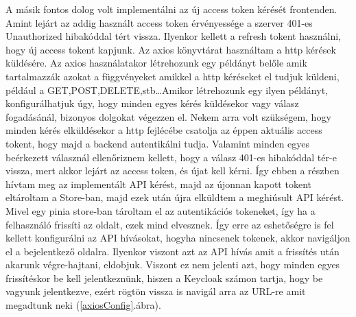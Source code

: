 \documentclass[a4paper,twoside]{article}
\begin{document}
A másik fontos dolog volt implementálni az új access token kérését frontenden. Amint lejárt az addig használt access token érvényessége a szerver 401-es Unauthorized 
hibakóddal tért vissza. Ilyenkor kellett a refresh tokent használni, hogy új access tokent kapjunk. Az axios könyvtárat használtam a http kérések küldésére. Az axios 
használatakor létrehozunk egy példányt belőle amik tartalmazzák azokat a függvényeket amikkel a http kéréseket el tudjuk küldeni, például a GET,POST,DELETE,stb\ldots Amikor létrehozunk egy ilyen példányt, konfigurálhatjuk úgy, hogy minden egyes kérés küldésekor vagy válasz fogadásánál, bizonyos dolgokat végezzen el. Nekem arra volt szükségem, hogy minden kérés elküldésekor a http fejlécébe csatolja az éppen aktuális access tokent, hogy majd a backend autentikálni tudja. Valamint minden egyes beérkezett válasznál ellenőriznem kellett, hogy a válasz 401-es hibakóddal tér-e vissza, mert akkor lejárt az access token, és újat kell kérni. Így ebben a részben hívtam meg az implementált API kérést, majd az újonnan kapott tokent eltároltam a Store-ban, majd ezek után újra elküldtem a meghiúsult API kérést. Mivel egy 
pinia store-ban tároltam el az autentikációs tokeneket, így ha a felhasználó frissíti az oldalt, ezek mind elvesznek. Így erre az eshetőségre is fel kellett konfigurálni az API hívásokat, hogyha nincsenek tokenek, akkor navigáljon el a bejelentkező oldalra. Ilyenkor viszont azt az API hívás amit a frissítés után akarunk végre-hajtani, eldobjuk. Viszont ez nem jelenti azt, hogy minden egyes frissítéskor be kell jelentkeznünk, hiszen a Keycloak számon tartja, hogy be vagyunk jelentkezve, ezért rögtön vissza is navigál arra az URL-re amit megadtunk neki (\ref{axiosConfig}.ábra).
\end{document}

